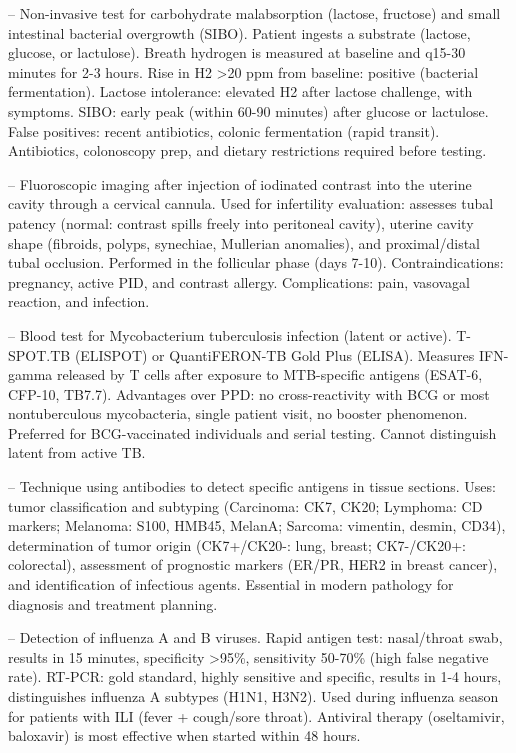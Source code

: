 -- Non-invasive test for carbohydrate malabsorption (lactose, fructose) and small intestinal bacterial overgrowth (SIBO). Patient ingests a substrate (lactose, glucose, or lactulose). Breath hydrogen is measured at baseline and q15-30 minutes for 2-3 hours. Rise in H2 >20 ppm from baseline: positive (bacterial fermentation). Lactose intolerance: elevated H2 after lactose challenge, with symptoms. SIBO: early peak (within 60-90 minutes) after glucose or lactulose. False positives: recent antibiotics, colonic fermentation (rapid transit). Antibiotics, colonoscopy prep, and dietary restrictions required before testing.

-- Fluoroscopic imaging after injection of iodinated contrast into the uterine cavity through a cervical cannula. Used for infertility evaluation: assesses tubal patency (normal: contrast spills freely into peritoneal cavity), uterine cavity shape (fibroids, polyps, synechiae, Mullerian anomalies), and proximal/distal tubal occlusion. Performed in the follicular phase (days 7-10). Contraindications: pregnancy, active PID, and contrast allergy. Complications: pain, vasovagal reaction, and infection.

-- Blood test for Mycobacterium tuberculosis infection (latent or active). T-SPOT.TB (ELISPOT) or QuantiFERON-TB Gold Plus (ELISA). Measures IFN-gamma released by T cells after exposure to MTB-specific antigens (ESAT-6, CFP-10, TB7.7). Advantages over PPD: no cross-reactivity with BCG or most nontuberculous mycobacteria, single patient visit, no booster phenomenon. Preferred for BCG-vaccinated individuals and serial testing. Cannot distinguish latent from active TB.

-- Technique using antibodies to detect specific antigens in tissue sections. Uses: tumor classification and subtyping (Carcinoma: CK7, CK20; Lymphoma: CD markers; Melanoma: S100, HMB45, MelanA; Sarcoma: vimentin, desmin, CD34), determination of tumor origin (CK7+/CK20-: lung, breast; CK7-/CK20+: colorectal), assessment of prognostic markers (ER/PR, HER2 in breast cancer), and identification of infectious agents. Essential in modern pathology for diagnosis and treatment planning.

-- Detection of influenza A and B viruses. Rapid antigen test: nasal/throat swab, results in 15 minutes, specificity >95\%, sensitivity 50-70\% (high false negative rate). RT-PCR: gold standard, highly sensitive and specific, results in 1-4 hours, distinguishes influenza A subtypes (H1N1, H3N2). Used during influenza season for patients with ILI (fever + cough/sore throat). Antiviral therapy (oseltamivir, baloxavir) is most effective when started within 48 hours.

